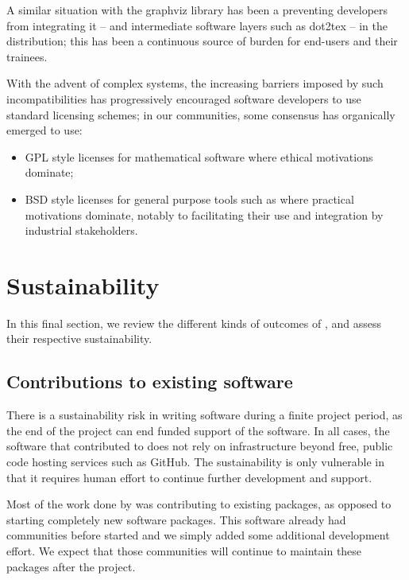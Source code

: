 \documentclass{deliverablereport}
\begin{document}
A similar situation with the graphviz library has been a preventing
developers from integrating it -- and intermediate software layers
such as dot2tex -- in the \SageMath distribution; this has been a
continuous source of burden for end-users and their trainees.

With the advent of complex systems, the increasing barriers imposed by
such incompatibilities has progressively encouraged software
developers to use standard licensing schemes; in our communities, some
consensus has organically emerged to use:
\begin{itemize}
\item GPL style licenses for mathematical software where ethical
  motivations dominate;
\item BSD style licenses for general purpose tools such as \Jupyter
  where practical motivations dominate, notably to facilitating their
  use and integration by industrial stakeholders.
\end{itemize}


\section{Sustainability}

In this final section, we review the different kinds of outcomes of
\ODK, and assess their respective sustainability.

\subsection{Contributions to existing software}

There is a sustainability risk in writing software during a finite project period,
as the end of the project can end funded support of the software.
In all cases, the software that \ODK contributed to does not rely on infrastructure
beyond free, public code hosting services such as GitHub.
The sustainability is only vulnerable
in that it requires human effort to continue further development and support.

Most of the work done by \ODK was contributing to existing packages,
as opposed to starting completely new software packages.
This software already had communities before \ODK started
and we simply added some additional development effort.
We expect that those communities will continue to maintain
these packages after the project.
\end{document}
